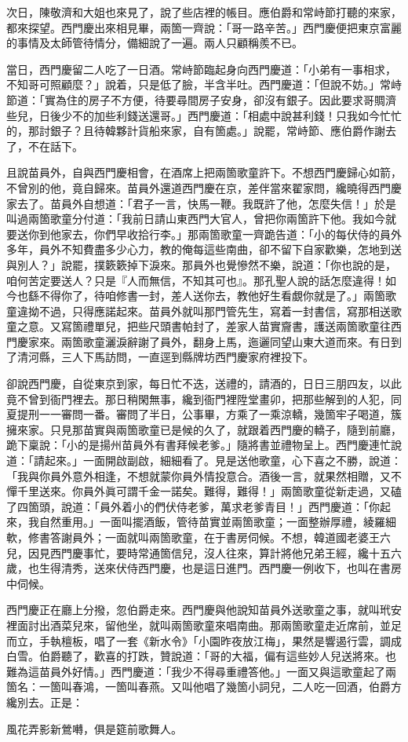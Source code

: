 次日，陳敬濟和大姐也來見了，說了些店裡的帳目。應伯爵和常峙節打聽的來家，都來探望。西門慶出來相見畢，兩箇一齊說：「哥一路辛苦。」西門慶便把東京富麗的事情及太師管待情分，備細說了一遍。兩人只顧稱羨不已。

當日，西門慶留二人吃了一日酒。常峙節臨起身向西門慶道：「小弟有一事相求，不知哥可照顧麼？」說着，只是低了臉，半含半吐。{}西門慶道：「但說不妨。」常峙節道：「實為住的房子不方便，待要尋間房子安身，卻沒有銀子。因此要求哥賙濟些兒，日後少不的加些利錢送還哥。」西門慶道：「相處中說甚利錢！只我如今忙忙的，那討銀子？且待韓夥計貨船來家，自有箇處。」說罷，常峙節、應伯爵作謝去了，不在話下。

且說苗員外，自與西門慶相會，在酒席上把兩箇歌童許下。不想西門慶歸心如箭，不曾別的他，竟自歸來。苗員外還道西門慶在京，差伴當來翟家問，纔曉得西門慶家去了。苗員外自想道：「君子一言，快馬一鞭。我既許了他，怎麼失信！」於是叫過兩箇歌童分付道：「我前日請山東西門大官人，曾把你兩箇許下他。我如今就要送你到他家去，你們早收拾行李。」那兩箇歌童一齊跪告道：「小的每伏侍的員外多年，員外不知費盡多少心力，教的俺每這些南曲，卻不留下自家歡樂，怎地到送與別人？」說罷，撲簌簌掉下淚來。那員外也覺慘然不樂，說道：「你也說的是，咱何苦定要送人？只是『人而無信，不知其可也』。那孔聖人說的話怎麼違得！如今也繇不得你了，待咱修書一封，差人送你去，{}教他好生看覷你就是了。」兩箇歌童違拗不過，只得應諾起來。苗員外就叫那門管先生，寫着一封書信，寫那相送歌童之意。又寫箇禮單兒，把些尺頭書帕封了，差家人苗實齎書，護送兩箇歌童往西門慶家來。兩箇歌童灑淚辭謝了員外，翻身上馬，迤邐同望山東大道而來。有日到了清河縣，三人下馬訪問，一直逕到縣牌坊西門慶家府裡投下。

卻說西門慶，自從東京到家，每日忙不迭，送禮的，請酒的，日日三朋四友，以此竟不曾到衙門裡去。那日稍閑無事，纔到衙門裡陞堂畫卯，把那些解到的人犯，同夏提刑一一審問一番。審問了半日，公事畢，方乘了一乘涼轎，幾箇牢子喝道，簇擁來家。只見那苗實與兩箇歌童已是候的久了，就跟着西門慶的轎子，隨到前廳，跪下稟說：「小的是揚州苗員外有書拜候老爹。」隨將書並禮物呈上。西門慶連忙說道：「請起來。」一面開啟副啟，細細看了。見是送他歌童，心下喜之不勝，說道：「我與你員外意外相逢，不想就蒙你員外情投意合。酒後一言，就果然相贈，又不憚千里送來。你員外眞可謂千金一諾矣。難得，難得！」兩箇歌童從新走過，又磕了四箇頭，說道：「員外着小的們伏侍老爹，萬求老爹青目！」西門慶道：「你起來，我自然重用。」一面叫擺酒飯，管待苗實並兩箇歌童；一面整辦厚禮，綾羅細軟，修書答謝員外；一面就叫兩箇歌童，在于書房伺候。不想，韓道國老婆王六兒，因見西門慶事忙，要時常通箇信兒，沒人往來，算計將他兄弟王經，纔十五六歲，也生得清秀，送來伏侍西門慶，也是這日進門。西門慶一例收下，也叫在書房中伺候。

西門慶正在廳上分撥，忽伯爵走來。西門慶與他說知苗員外送歌童之事，就叫玳安裡面討出酒菜兒來，留他坐，就叫兩箇歌童來唱南曲。那兩箇歌童走近席前，並足而立，手執檀板，唱了一套《新水令》「小園昨夜放江梅」，果然是響遏行雲，調成白雪。伯爵聽了，歡喜的打跌，贊說道：「哥的大福，偏有這些妙人兒送將來。也難為這苗員外好情。」西門慶道：「我少不得尋重禮答他。」一面又與這歌童起了兩箇名：一箇叫春鴻，一箇叫春燕。又叫他唱了幾箇小詞兒，二人吃一回酒，伯爵方纔別去。正是：

\begin{myquote}
風花弄影新鶯囀，俱是筵前歌舞人。
\end{myquote}

